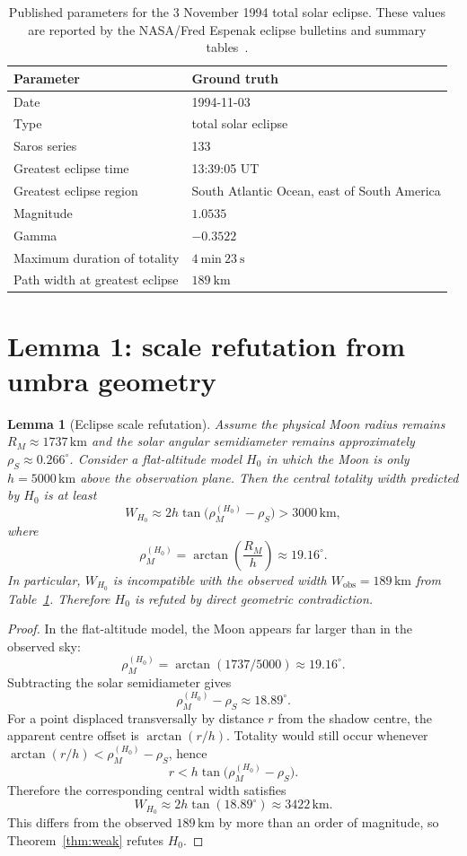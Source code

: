 \documentclass[11pt]{article}
\newtheorem{lemma}[theorem]{Lemma}
\theoremstyle{definition}
\theoremstyle{remark}
\begin{document}
\begin{table}[h]
\centering
\begin{tabular}{ll}
\toprule
Parameter & Ground truth \\
\midrule
Date & 1994-11-03 \\
Type & total solar eclipse \\
Saros series & 133 \\
Greatest eclipse time & 13:39:05 UT \\
Greatest eclipse region & South Atlantic Ocean, east of South America \\
Magnitude & \(1.0535\) \\
Gamma & \(-0.3522\) \\
Maximum duration of totality & \(4\ \mathrm{min}\ 23\ \mathrm{s}\) \\
Path width at greatest eclipse & \(189\ \mathrm{km}\) \\
\bottomrule
\end{tabular}
\caption{Published parameters for the 3 November 1994 total solar eclipse.
These values are reported by the NASA/Fred Espenak eclipse bulletins and
summary tables~\cite{Espenak1994,EspenakCanon}.}
\label{tab:truth}
\end{table}

\section{Lemma 1: scale refutation from umbra geometry}

\begin{lemma}[Eclipse scale refutation]\label{lem:scale_refutation}
Assume the physical Moon radius remains \(R_M\approx 1737\,\mathrm{km}\) and
the solar angular semidiameter remains approximately
\(\rho_S\approx 0.266^\circ\). Consider a flat-altitude model \(H_0\) in which
the Moon is only \(h=5000\,\mathrm{km}\) above the observation plane. Then the
central totality width predicted by \(H_0\) is at least
\[
W_{H_0}\approx 2h\tan\!\bigl(\rho_M^{(H_0)}-\rho_S\bigr)
> 3000\,\mathrm{km},
\]
where
\[
\rho_M^{(H_0)}=\arctan\!\left(\frac{R_M}{h}\right)\approx 19.16^\circ.
\]
In particular, \(W_{H_0}\) is incompatible with the observed width
\(W_{\mathrm{obs}}=189\,\mathrm{km}\) from Table~\ref{tab:truth}. Therefore
\(H_0\) is refuted by direct geometric contradiction.
\end{lemma}

\begin{proof}
In the flat-altitude model, the Moon appears far larger than in the observed
sky:
\[
\rho_M^{(H_0)}=\arctan(1737/5000)\approx 19.16^\circ.
\]
Subtracting the solar semidiameter gives
\[
\rho_M^{(H_0)}-\rho_S \approx 18.89^\circ.
\]
For a point displaced transversally by distance \(r\) from the shadow centre,
the apparent centre offset is \(\arctan(r/h)\). Totality would still occur
whenever \(\arctan(r/h)<\rho_M^{(H_0)}-\rho_S\), hence
\[
r<h\tan\!\bigl(\rho_M^{(H_0)}-\rho_S\bigr).
\]
Therefore the corresponding central width satisfies
\[
W_{H_0}\approx 2h\tan(18.89^\circ)\approx 3422\,\mathrm{km}.
\]
This differs from the observed \(189\,\mathrm{km}\) by more than an order of
magnitude, so Theorem~\ref{thm:weak} refutes \(H_0\).
\end{proof}
\end{document}
